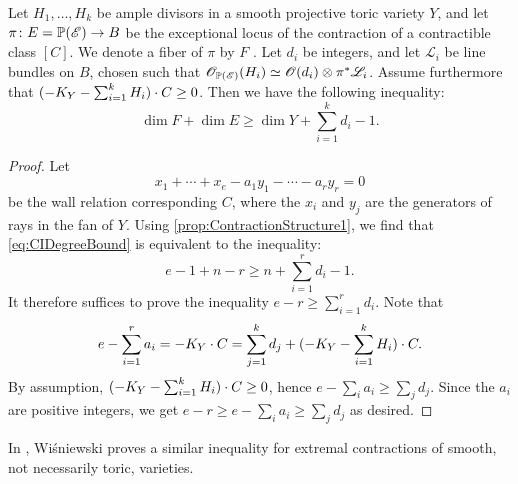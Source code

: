 \begin{proposition}
	\label{prop:SumDegreesBound}
	Let $H_1, \dots, H_k$ be ample divisors in a smooth projective toric variety $Y$, and let $\pi \colon E = \mathbb{P}(\mathscr{E}) \to B$ be the exceptional locus of the contraction of a contractible class $[C]$. We denote a fiber of $\pi$ by $F$ . Let $d_i$ be integers, and let $\mathscr{L}_i$ be line bundles on $B$, chosen such that $\mathscr{O}_{\mathbb{P}(\mathscr{E})}(H_i) \simeq \mathscr{O}(d_i) \otimes \pi^*\mathscr{L}_i$. Assume furthermore that $(-K_Y - \sum_{i=1}^k H_i) \cdot C \geq 0$. Then we have the following inequality: 
	\begin{equation}
		\label{eq:CIDegreeBound}
		\dim F + \dim E \geq \dim Y + \sum_{i=1}^k d_i -1.
	\end{equation}
	
\end{proposition}
\begin{proof}
  	 Let
  	\[x_1 + \cdots + x_e - a_1 y_1 - \cdots - a_r y_r =0 \]
  	be the wall relation corresponding $C$,
  	where the $x_i$ and $y_j$ are the generators of rays in the fan of $Y$. Using \cref{prop:ContractionStructure1}, we find that \eqref{eq:CIDegreeBound} is equivalent to the inequality:
	\[e-1 + n - r  \geq n + \sum_{i=1}^r d_i - 1. \]
	It therefore suffices to prove the inequality $e-r \geq \sum_{i=1}^rd_i$. Note that
	\[ e - \sum_{i=1}^r a_i = -K_Y \cdot C = \sum_{j=1}^k d_j + (-K_Y - \sum_{i=1}^k H_i) \cdot C. \]
	By assumption, $(-K_Y - \sum_{i=1}^k H_i) \cdot C \geq 0$, hence $e-\sum_i a_i \geq \sum_j d_j$. Since the $a_i$ are positive integers, we get $e-r \geq e-\sum_i a_i \geq \sum_j d_j$ as desired.
\end{proof}

\begin{remark}
	In \cite{Wis91}, Wi\'{s}niewski proves a similar inequality for extremal contractions of smooth, not necessarily toric, varieties.
\end{remark}

